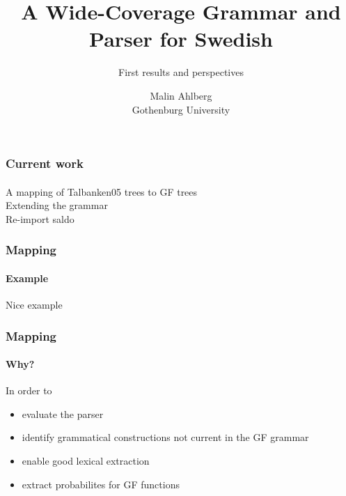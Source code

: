 \documentclass[10pt]{beamer}
\title{A Wide-Coverage Grammar and Parser for Swedish}
\subtitle{\large First results and perspectives}
\author{Malin Ahlberg \\ Gothenburg University}
\date{}
\begin{document}
\maketitle

\begin{frame}
\frametitle{Current work}
\framesubtitle{} 
A mapping of Talbanken05 trees to GF trees\\
Extending the grammar \\
Re-import saldo\\
\end{frame}

\begin{frame}
\frametitle{Mapping}
\framesubtitle{Example} 
Nice example
\end{frame}


\begin{frame}
\frametitle{Mapping}
\framesubtitle{Why?} 
In order to \\
\begin{itemize}
\item{evaluate the parser}
\item{identify grammatical constructions not current in the GF grammar}
\item{enable good lexical extraction}
\item{extract probabilites for GF functions}
\end{itemize}
\end{frame}

%
\end{document}
